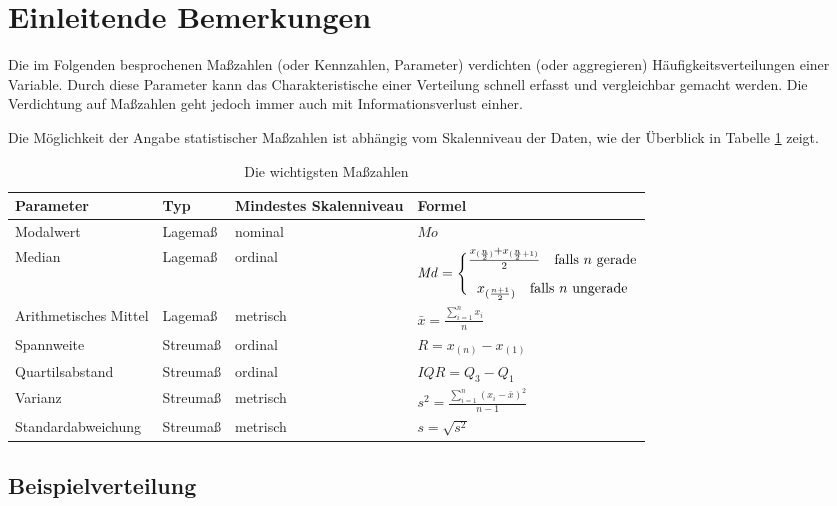 \documentclass[
  11pt,
  ngerman,
  a4paper,
]{report}
\begin{document}
\hypertarget{einleitende-bemerkungen}{%
\section{Einleitende Bemerkungen}\label{einleitende-bemerkungen}}

Die im Folgenden besprochenen Maßzahlen (oder Kennzahlen, Parameter) verdichten (oder aggregieren) Häufigkeitsverteilungen einer Variable. Durch diese Parameter kann das Charakteristische einer Verteilung schnell erfasst und vergleichbar gemacht werden. Die Verdichtung auf Maßzahlen geht jedoch immer auch mit Informationsverlust einher.

Die Möglichkeit der Angabe statistischer Maßzahlen ist abhängig vom Skalenniveau der Daten, wie der Überblick in Tabelle \ref{tab:mass} zeigt.

\begin{table}

\caption{\label{tab:mass}Die wichtigsten Maßzahlen}
\centering
\begin{tabular}[t]{llll}
\toprule
Parameter & Typ & Mindestes Skalenniveau & Formel\\
\midrule
Modalwert & Lagemaß & nominal & \medskip$\mathit{Mo}$\\
Median & Lagemaß & ordinal & \medskip$\def\arraystretch{1.2} \mathit{Md} = \Bigg\{\begin{array}{@{}c@{}}\frac{x_{(\frac{n}{2})}+x_{(\frac{n}{2}+1)}}{2} \quad \textrm{falls }n \textrm{ gerade}\\[6pt] x_{(\frac{n+1}{2})}\quad \textrm{falls }n \textrm{ ungerade}\end{array}$\\
Arithmetisches Mittel & Lagemaß & metrisch & \medskip$\bar{x}=\frac{\sum\limits_{i=1}^{n}x _{i}}{n}$\\
Spannweite & Streumaß & ordinal & \medskip$R=x_{(n)}-x_{(1)}$\\
Quartilsabstand & Streumaß & ordinal & \medskip$\mathit{IQR}=Q_3-Q_1$\\
Varianz & Streumaß & metrisch & \medskip$s^2=\frac{\sum\limits_{i=1}^{n}(x_{i}-\bar{x})^2}{n-1}$\\
Standardabweichung & Streumaß & metrisch & \medskip$s=\sqrt{s^2}$\\
\bottomrule
\end{tabular}
\end{table}

\hypertarget{beispielverteilung}{%
\subsection{Beispielverteilung}\label{beispielverteilung}}
\end{document}

